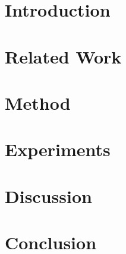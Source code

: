 \section{Introduction}
\label{sec:intro}

\section{Related Work}
\label{sec:related}

\section{Method}
\label{sec:method}

\section{Experiments}
\label{sec:experiments}

\section{Discussion}
\label{sec:discussion}

\section{Conclusion}
\label{sec:conclusion}
